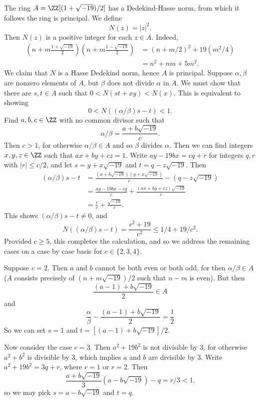 \begin{example}
    The ring $A = \ZZ[(1 + \sqrt{-19})/2]$ has a Dedekind-Hasse norm, from which it follows the ring is principal. We define
    \[ N(z) = |z|^2. \]
    Then $N(z)$ is a positive integer for each $z \in A$. Indeed,
    \begin{align*}
        \left( n + m \frac{1 + \sqrt{-19}}{2} \right) \left( n + m \frac{1 - \sqrt{-19}}{2} \right) &= (n + m/2)^2 + 19(m^2/4)\\
        &= n^2 + nm + 5m^2.
    \end{align*}
    We claim that $N$ is a Hasse Dedekind norm, hence $A$ is principal. Suppose $\alpha,\beta$ are nonzero elements of $A$, but $\beta$ does not divide $\alpha$ in $A$. We must show that there are $s,t \in A$ such that $0 < N(st + xy) < N(x)$. This is equivalent to showing
    \[ 0 < N \left( (\alpha/\beta) s - t \right) < 1. \]
    Find $a,b,c \in \ZZ$ with no common divisor such that
    \[ \alpha/\beta = \frac{a + b\sqrt{-19}}{c}. \]
    Then $c > 1$, for otherwise $\alpha/\beta \in A$ and so $\beta$ divides $\alpha$. Then we can find integers $x,y,z \in \ZZ$ such that $ax + by + cz = 1$. Write $ay - 19bx = cq + r$ for integers $q,r$ with $|r| \leq c/2$, and let $s = y + x \sqrt{-19}$ and $t = q - z \sqrt{-19}$. Then
    \begin{align*}
        (\alpha/\beta) s - t &= \frac{(a + b \sqrt{-19})(y + x \sqrt{-19})}{c} - (q - z \sqrt{-19})\\
        &= \frac{ay - 19bx - cq}{c} + \frac{(ax + by + cz) \sqrt{-19}}{c}\\
        &= \frac{r}{c} + \frac{\sqrt{-19}}{c}.
    \end{align*}
    This shows $(\alpha/\beta) s - t \neq 0$, and
    \[ N((\alpha/\beta) s - t) = \frac{r^2 + 19}{c^2} \leq 1/4 + 19/c^2. \]
    Provided $c \geq 5$, this completes the calculation, and so we address the remaining cases on a case by case basis for $c \in \{ 2, 3, 4 \}$.

    Suppose $c = 2$. Then $a$ and $b$ cannot be both even or both odd, for then $\alpha/\beta \in A$ ($A$ consists precisely of $(n + m\sqrt{-19})/2$ such that $n - m$ is even). But then
    \[ \frac{(a - 1) + b \sqrt{-19}}{2} \in A \]
    and
    \[ \frac{\alpha}{\beta} - \frac{(a-1) + b \sqrt{-19}}{2} = \frac{1}{2} \]
    So we can set $s = 1$ and $t = [(a-1) + b\sqrt{-19}]/2$.

    Now consider the case $c = 3$. Then $a^2 + 19b^2$ is not divisible by 3, for otherwise $a^2 + b^2$ is divisible by 3, which implies $a$ and $b$ are divisible by $3$. Write $a^2 + 19b^2 = 3q + r$, where $r = 1$ or $r = 2$. Then
    \[ \frac{a + b \sqrt{-19}}{3} (a - b \sqrt{-19}) - q = r/3 < 1. \]
    so we may pick $s = a - b \sqrt{-19}$ and $t = q$.


\end{example}
